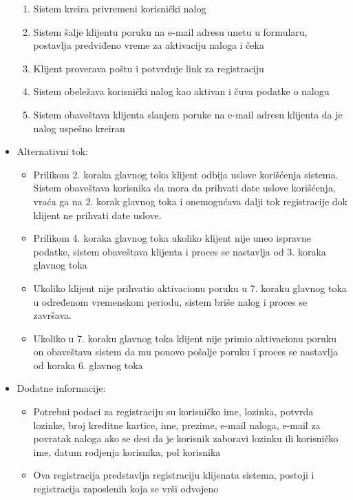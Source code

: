 \documentclass[a4paper]{article}
\begin{document}
\begin{itemize}
\begin{enumerate}
            \item Sistem kreira privremeni korisnički nalog
            \item Sistem šalje klijentu poruku na e-mail adresu unetu u formularu, postavlja predviđeno vreme za aktivaciju naloga i čeka
            \item Klijent proverava poštu i potvrđuje link za registraciju
            \item Sistem obeležava korisnički nalog kao aktivan i čuva podatke o nalogu
            \item Sistem obaveštava klijenta slanjem poruke na e-mail adresu klijenta da je nalog uspešno kreiran 
        \end{enumerate}
    \item Alternativni tok:
        \begin{itemize}
            \item Prilikom 2. koraka glavnog toka klijent odbija uslove korišćenja sistema. Sistem obaveštava korisnika da mora da prihvati date uslove korišćenja, vraća ga na 2. korak glavnog toka i onemogućava dalji tok registracije dok klijent ne prihvati date uslove.
            \item Prilikom 4. koraka glavnog toka ukoliko klijent nije uneo ispravne podatke, sistem obaveštava klijenta i proces se nastavlja od 3. koraka glavnog toka
            \item Ukoliko klijent nije prihvatio aktivacionu poruku u 7. koraku glavnog toka u određenom vremenskom periodu, sistem briše nalog i proces se završava.
            \item Ukoliko u 7. koraku glavnog toka klijent nije primio aktivacionu poruku on obaveštava sistem da mu ponovo pošalje poruku i proces se nastavlja od koraka 6. glavnog toka
        \end{itemize}
    \item Dodatne informacije:
        \begin{itemize}
            \item Potrebni podaci za registraciju su korisničko ime, lozinka, potvrda lozinke, broj kreditne kartice, ime, prezime, e-mail naloga, e-mail za povratak naloga ako se desi da je korisnik zaboravi lozinku ili korisničko ime, datum rodjenja korisnika, pol korisnika
            \item Ova registracija predstavlja registraciju klijenata sistema, postoji i registracija zaposlenih koja se vrši odvojeno
        \end{itemize}
\end{itemize}
\end{document}
